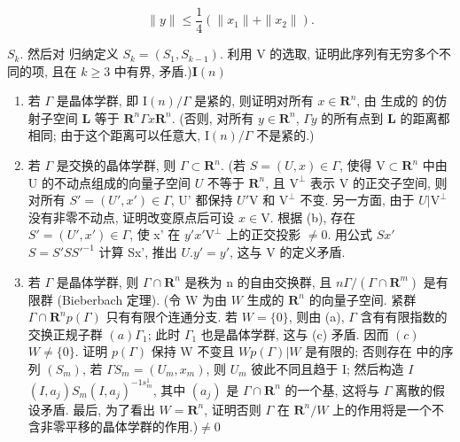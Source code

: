 \[
\| y \| \leqslant \frac {1}{4} (\| x _ {1} \| + \| x _ {2} \|).
\]

\(S_{k}\). 然后对  归纳定义 \(S_{k}=(S_{1},S_{k-1})\). 利用 V 的选取, 证明此序列有无穷多个不同的项, 且在 \(k\geqslant3\) 中有界, 矛盾.)\(\mathbf{I}(n)\)

\begin{enumerate}
\def\labelenumi{(\alph{enumi})}
\setcounter{enumi}{1}
\item
  若 \(\Gamma\) 是晶体学群, 即 \(\mathrm{I}(n)/\Gamma\) 是紧的, 则证明对所有 \(x \in \mathbf{R}^n\), 由  生成的  的仿射子空间 \(\mathbf{L}\) 等于 \(\mathbf{R}^n\)\(\Gamma x\)\(\mathbf{R}^n\). (否则, 对所有 \(y \in \mathbf{R}^n\), \(\Gamma y\) 的所有点到 \(\mathbf{L}\) 的距离都相同; 由于这个距离可以任意大, \(\mathrm{I}(n)/\Gamma\) 不是紧的.)
\item
  若 \(\Gamma\) 是交换的晶体学群, 则 \(\Gamma \subset \mathbf{R}^n\). (若 \(S = (U, x) \in \Gamma\), 使得 \(\mathrm{V} \subset \mathbf{R}^n\) 中由 U 的不动点组成的向量子空间 \(U\) 不等于 \(\mathbf{R}^n\), 且 \(\mathrm{V}^\perp\) 表示 \(\mathrm{V}\) 的正交子空间, 则对所有 \(S' = (U', x') \in \Gamma\), U' 都保持 \(U'\)\(\mathrm{V}\) 和 \(\mathrm{V}^\perp\) 不变. 另一方面, 由于 \(U|\mathrm{V}^\perp\) 没有非零不动点, 证明改变原点后可设 \(x \in \mathrm{V}\). 根据 (b), 存在 \(S' = (U', x') \in \Gamma\), 使 x' 在 \(y'\)\(x'\)\(\mathrm{V}^\perp\) 上的正交投影 \(\neq 0\). 用公式 \(Sx'\)\(S = S'SS'^{-1}\) 计算 Sx', 推出 \(U.y' = y'\), 这与 \(\mathrm{V}\) 的定义矛盾.
\item
  若 \(\Gamma\) 是晶体学群, 则 \(\Gamma \cap \mathbf{R}^n\) 是秩为 n 的自由交换群, 且 \(n\)\(\Gamma / (\Gamma \cap \mathbf{R}^m)\) 是有限群 (Bieberbach 定理). (令 W 为由 \(W\) 生成的 \(\mathbf{R}^n\) 的向量子空间. 紧群 \(\Gamma \cap \mathbf{R}^n\)\(p(\Gamma)\) 只有有限个连通分支. 若 \(W = \{0\}\), 则由 (a), \(\Gamma\) 含有有限指数的交换正规子群 \((a)\)\(\Gamma_1\); 此时 \(\Gamma_1\) 也是晶体学群, 这与 (c) 矛盾. 因而 \((c)\)\(W \neq \{0\}\). 证明 \(p(\Gamma)\) 保持 W 不变且 \(W\)\(p(\Gamma)|W\) 是有限的; 否则存在  中的序列 \((S_m)\), 若 \(\Gamma\)\(S_m = (U_m, x_m)\), 则 \(U_m\) 彼此不同且趋于 I; 然后构造 \(I\)\((I, a_j)S_m(I, a_j)^{-1s_m^1}\), 其中 \((a_j)\) 是 \(\Gamma \cap \mathbf{R}^n\) 的一个基, 这将与 \(\Gamma\) 离散的假设矛盾. 最后, 为了看出 \(W = \mathbf{R}^n\), 证明否则 \(\Gamma\) 在 \(\mathbf{R}^n/W\) 上的作用将是一个不含非零平移的晶体学群的作用.)\(\neq 0\)
\end{enumerate}


